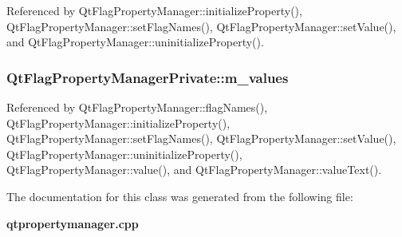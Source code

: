 Referenced by Qt\+Flag\+Property\+Manager\+::initialize\+Property(), Qt\+Flag\+Property\+Manager\+::set\+Flag\+Names(), Qt\+Flag\+Property\+Manager\+::set\+Value(), and Qt\+Flag\+Property\+Manager\+::uninitialize\+Property().

\subsubsection[{m\+\_\+values}]{ Qt\+Flag\+Property\+Manager\+Private\+::m\+\_\+values}\label{classQtFlagPropertyManagerPrivate_a042838be20f0c6e9ffa2ebaabded3e3b}


Referenced by Qt\+Flag\+Property\+Manager\+::flag\+Names(), Qt\+Flag\+Property\+Manager\+::initialize\+Property(), Qt\+Flag\+Property\+Manager\+::set\+Flag\+Names(), Qt\+Flag\+Property\+Manager\+::set\+Value(), Qt\+Flag\+Property\+Manager\+::uninitialize\+Property(), Qt\+Flag\+Property\+Manager\+::value(), and Qt\+Flag\+Property\+Manager\+::value\+Text().



The documentation for this class was generated from the following file\+:\begin{DoxyCompactItemize}
\item 
{\bf qtpropertymanager.\+cpp}\end{DoxyCompactItemize}
